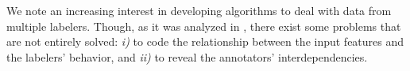 \documentclass[journal]{IEEEtran}
\begin{document}

We note an increasing interest in developing algorithms to deal with data from multiple labelers. Though, as it was analyzed in \cite{g2019machine}, there exist some problems that are not entirely solved: \textit{i)} to code the relationship between the input features and the labelers' behavior, and \textit{ii)} to reveal the annotators' interdependencies. 
\end{document}
